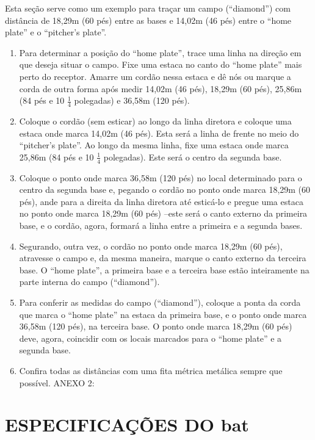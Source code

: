 \begin{multicols}{2}
	Esta seção serve como um exemplo para traçar um campo (“diamond”) com distância 
	de 18,29m (60 pés) entre as bases e 14,02m (46 pés) entre o “home plate” e o 
	“pitcher’s plate”. 
	\begin{enumerate}[label= \arabic*)]
		\item  Para determinar a posição do “home plate”, trace uma linha na direção em que 
		deseja situar o campo. Fixe uma estaca no canto do “home plate” mais perto do 
		receptor. Amarre um cordão nessa estaca e dê nós ou marque a corda de outra forma 
		após medir 14,02m (46 pés), 18,29m (60 pés), 25,86m (84 pés e 10 $\frac{1}{4}$ polegadas) e 
		36,58m (120 pés). 
		\item  Coloque o cordão (sem esticar) ao longo da linha diretora e coloque uma estaca 
		onde marca 14,02m (46 pés). Esta será a linha de frente no meio do “pitcher’s plate”. 
		Ao longo da mesma linha, fixe uma estaca onde marca 25,86m (84 pés e 10 $\frac{1}{4}$ 
		polegadas). Este será o centro da segunda base. 
		\item  Coloque o ponto onde marca 36,58m (120 pés) no local determinado para o centro 
		da segunda base e, pegando o cordão no ponto onde marca 18,29m (60 pés), ande 
		para a direita da linha diretora até esticá-lo e pregue uma estaca no ponto onde marca 
		18,29m (60 pés) –este será o canto externo da primeira base, e o cordão, agora, 
		formará a linha entre a primeira e a segunda bases. 
		\item  Segurando, outra vez, o cordão no ponto onde marca 18,29m (60 pés), atravesse o 
		campo e, da mesma maneira, marque o canto externo da terceira base. O “home 
		plate”, a primeira base e a terceira base estão inteiramente na parte interna do campo 
		(“diamond”). 
		\item  Para conferir as medidas do campo (“diamond”), coloque a ponta da corda que 
		marca o “home plate” na estaca da primeira base, e o ponto onde marca 36,58m (120 
		pés), na terceira base. O ponto onde marca 18,29m (60 pés) deve, agora, coincidir com 
		os locais marcados para o “home plate” e a segunda base. 
		\item  Confira todas as distâncias com uma fita métrica metálica sempre que possível. ANEXO 2: 
	\end{enumerate}
\end{multicols}


\chapter{ESPECIFICAÇÕES DO \gls{bat} }

